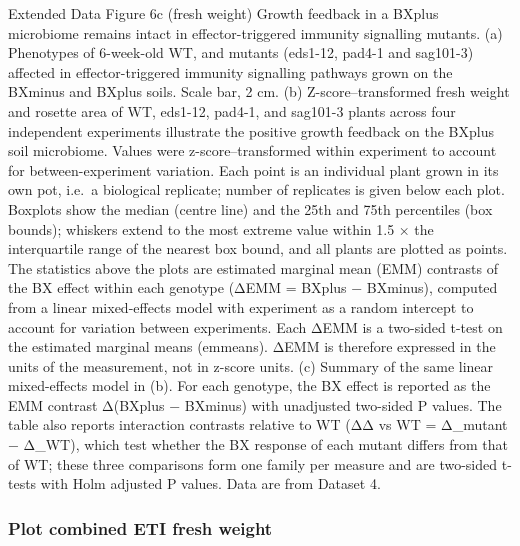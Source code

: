 \documentclass[
  10pt,
]{article}
\begin{document}
Extended Data Figure 6c (fresh weight) \textbar{} Growth feedback in a
BXplus microbiome remains intact in effector-triggered immunity
signalling mutants. (a) Phenotypes of 6-week-old WT, and mutants
(eds1-12, pad4-1 and sag101-3) affected in effector-triggered immunity
signalling pathways grown on the BXminus and BXplus soils. Scale bar, 2
cm. (b) Z-score--transformed fresh weight and rosette area of WT,
eds1-12, pad4-1, and sag101-3 plants across four independent experiments
illustrate the positive growth feedback on the BXplus soil microbiome.
Values were z-score--transformed within experiment to account for
between-experiment variation. Each point is an individual plant grown in
its own pot, i.e.~a biological replicate; number of replicates is given
below each plot. Boxplots show the median (centre line) and the 25th and
75th percentiles (box bounds); whiskers extend to the most extreme value
within 1.5 × the interquartile range of the nearest box bound, and all
plants are plotted as points. The statistics above the plots are
estimated marginal mean (EMM) contrasts of the BX effect within each
genotype (ΔEMM = BXplus − BXminus), computed from a linear mixed-effects
model with experiment as a random intercept to account for variation
between experiments. Each ΔEMM is a two-sided t-test on the estimated
marginal means (emmeans). ΔEMM is therefore expressed in the units of
the measurement, not in z-score units. (c) Summary of the same linear
mixed-effects model in (b). For each genotype, the BX effect is reported
as the EMM contrast Δ(BXplus − BXminus) with unadjusted two-sided P
values. The table also reports interaction contrasts relative to WT (ΔΔ
vs WT = Δ\_mutant − Δ\_WT), which test whether the BX response of each
mutant differs from that of WT; these three comparisons form one family
per measure and are two-sided t-tests with Holm adjusted P values. Data
are from Dataset 4.

\subsubsection{Plot combined ETI fresh
weight}\label{plot-combined-eti-fresh-weight}
\end{document}
